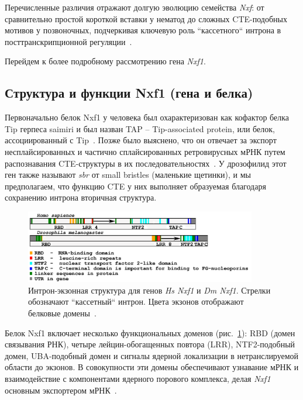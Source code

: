 Перечисленные различия отражают долгую эволюцию семейства \textit{Nxf}: от сравнительно простой короткой вставки у нематод до сложных CTE-подобных мотивов у позвоночных, подчеркивая ключевую роль ``кассетного`` интрона в посттранскрипционной регуляции~\cite{Golubkova2012, Mamon2013}.

Перейдем к более подробному рассмотрению гена \textit{Nxf1}.


\subsection{Структура и функции Nxf1 (гена и белка)}

Первоначально белок Nxf1 у человека был охарактеризован как кофактор белка Tip герпеса saimiri и был назван TAP – Tip-associated protein, или белок, ассоциированный с Tip~\cite{Yoon1997}.
Позже было выяснено, что он отвечает за экспорт несплайсированных и частично сплайсированных ретровирусных мРНК путем распознавания CTE-структуры в их последовательностях~\cite{Zolotukhin2001}.
У дрозофилид этот ген также называют \textit{sbr} от small bristles (маленькие щетинки), и мы предполагаем, что функцию CTE у них выполняет образуемая благодаря сохранению интрона вторичная структура.

\begin{figure}[h] %
    \centering
    \includegraphics[width=0.9\textwidth]{images/dm_hs_nxf1_structure}
    \caption{Интрон-экзонная структура для генов \textit{Hs Nxf1} и \textit{Dm Nxf1}. Стрелки обозначают ``кассетный`` интрон. Цвета экзонов отображают белковые домены~\cite{Mamon2013}.}
    \label{fig:dm_hs_nxf1_structure}
\end{figure}

Белок Nxf1 включает несколько функциональных доменов (рис.~\ref{fig:dm_hs_nxf1_structure}): RBD (домен связывания РНК), четыре лейцин-обогащенных повтора (LRR), NTF2-подобный домен, UBA-подобный домен и сигналы ядерной локализации в нетранслируемой области до экзонов.
В совокупности эти домены обеспечивают узнавание мРНК и взаимодействие с компонентами ядерного порового комплекса, делая \textit{Nxf1} основным экспортером мРНК~\cite{Herold2000,Mamon2013}.

